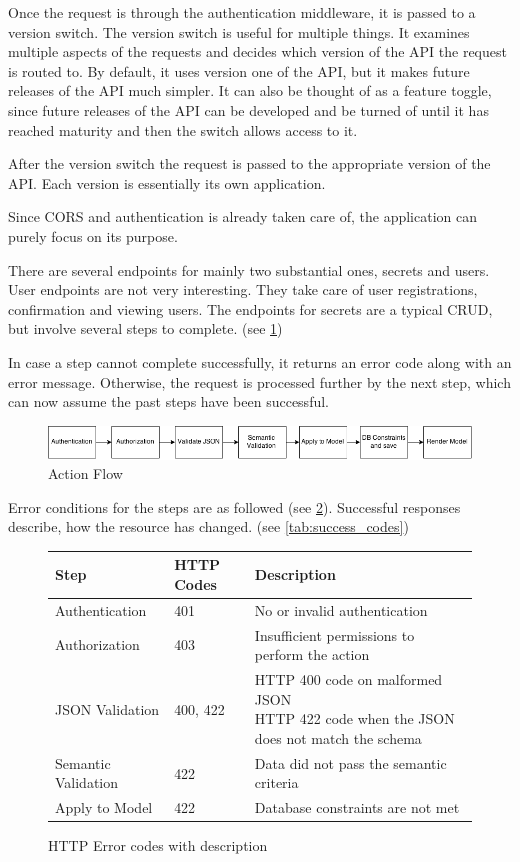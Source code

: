 Once the request is through the authentication middleware, it is passed to a
version switch. The version switch is useful for multiple things. It examines
multiple aspects of the requests and decides which version of the API the
request is routed to. By default, it uses version one of the API, but it makes
future releases of the API much simpler. It can also be thought of as a feature
toggle, since future releases of the API can be developed and be turned of
until it has reached maturity and then the switch allows access to it.

After the version switch the request is passed to the appropriate version of
the API. Each version is essentially its own application.

Since CORS and authentication is already taken care of, the application can
purely focus on its purpose.

There are several endpoints for mainly two substantial ones, secrets and users.
User endpoints are not very interesting. They take care of user registrations,
confirmation and viewing users. The endpoints for secrets are a typical CRUD,
but involve several steps to complete. (see \ref{fig:action_flow})

In case a step cannot complete successfully, it returns an error code along
with an error message. Otherwise, the request is processed further by the next
step, which can now assume the past steps have been successful.

\begin{figure}
  \includegraphics[scale=0.50]{pictures/action_flow.png}
  \caption{Action Flow}
  \centering
  \label{fig:action_flow}
\end{figure}

Error conditions for the steps are as followed (see \ref{tab:error_codes}).
Successful responses describe, how the resource has changed. (see
\ref{tab:success_codes})

\begin{figure}
  \begin{tabular}{|l|l|l|}
    \hline
    Step & HTTP Codes & Description \\ \hline
    Authentication & 401 & No or invalid authentication \\ \hline
    Authorization & 403 & Insufficient permissions to perform the action \\ \hline
    JSON Validation & 400, 422 & \parbox[t]{10cm}{HTTP 400 code on malformed JSON\\HTTP 422 code when the JSON does not match the schema} \\ \hline
    Semantic Validation & 422 & Data did not pass the semantic criteria \\ \hline
    Apply to Model & 422 & Database constraints are not met \\ \hline
  \end{tabular}
  \caption{HTTP Error codes with description}
  \centering
  \label{tab:error_codes}
\end{figure}

